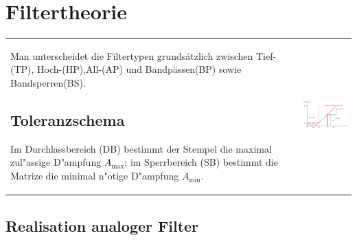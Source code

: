 \section{Filtertheorie }
\begin{tabular}{ll}
\parbox{12cm}{
	Man unterscheidet die Filtertypen grundsätzlich zwischen
	Tief-(TP), Hoch-(HP),All-(AP) und Bandpässen(BP) sowie Bandsperren(BS).
	
	\subsection{Toleranzschema }
  \label{toleranzschema}
	Im Durchlassbereich (DB) bestimmt der Stempel die maximal zul"assige D"ampfung
	$A_{\max}$; im Sperrbereich (SB) bestimmt die Matrize die minimal n"otige
	D"ampfung $A_{\min}$.}
	
& \parbox{6cm}{
	\includegraphics[width=6cm]{./images/filter-toleranzschema.png}}
\end{tabular}

\subsection{Realisation analoger Filter}
